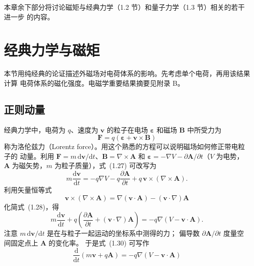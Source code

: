 本章余下部分将讨论磁矩与经典力学（1.2 节）和量子力学（1.3 节）相关的若干进一步
的内容。

\section{经典力学与磁矩}

本节用纯经典的论证描述外磁场对电荷体系的影响。先考虑单个电荷，再用该结果计算
电荷体系的磁化强度。电磁学重要结果摘要见附录 B。

\subsection{正则动量}

经典力学中，电荷为 $q$、速度为 $\mathbf{v}$ 的粒子在电场 $\boldsymbol{\varepsilon}$
和磁场 $\mathbf{B}$ 中所受力为
\begin{equation*}
\mathbf{F} = q(\boldsymbol{\varepsilon} + \mathbf{v}\times\mathbf{B})\tag{1.27}
\end{equation*}
称为洛伦兹力（Lorentz force）。用这个熟悉的方程可以说明磁场如何修正带电粒子的
动量。利用 $\mathbf{F}=m\,\mathrm{d}\mathbf{v}/\mathrm{d}t$、$\mathbf{B}=\nabla\times\mathbf{A}$
和 $\boldsymbol{\varepsilon}=-\nabla V-\partial\mathbf{A}/\partial t$（$V$ 为电势，
$\mathbf{A}$ 为磁矢势，$m$ 为粒子质量），式~(1.27) 可改写为
\begin{equation*}
m\frac{\mathrm{d}\mathbf{v}}{\mathrm{d}t} = -q\nabla V - q\frac{\partial\mathbf{A}}{\partial t} + q\,\mathbf{v}\times(\nabla\times\mathbf{A}).\tag{1.28}
\end{equation*}
利用矢量恒等式
\begin{equation*}
\mathbf{v}\times(\nabla\times\mathbf{A}) = \nabla(\mathbf{v}\cdot\mathbf{A}) - (\mathbf{v}\cdot\nabla)\mathbf{A}\tag{1.29}
\end{equation*}
化简式~(1.28)，得
\begin{equation*}
m\frac{\mathrm{d}\mathbf{v}}{\mathrm{d}t} + q\left(\frac{\partial\mathbf{A}}{\partial t} + (\mathbf{v}\cdot\nabla)\mathbf{A}\right) = -q\nabla(V - \mathbf{v}\cdot\mathbf{A}).\tag{1.30}
\end{equation*}
注意 $m\,\mathrm{d}\mathbf{v}/\mathrm{d}t$ 是在与粒子一起运动的坐标系中测得的力；
偏导数 $\partial\mathbf{A}/\partial t$ 度量空间固定点上 $\mathbf{A}$ 的变化率。
于是式~(1.30) 可写作
\begin{equation*}
\frac{\mathrm{d}}{\mathrm{d}t}(m\mathbf{v} + q\mathbf{A}) = -q\nabla(V - \mathbf{v}\cdot\mathbf{A})\tag{1.31}
\end{equation*}
